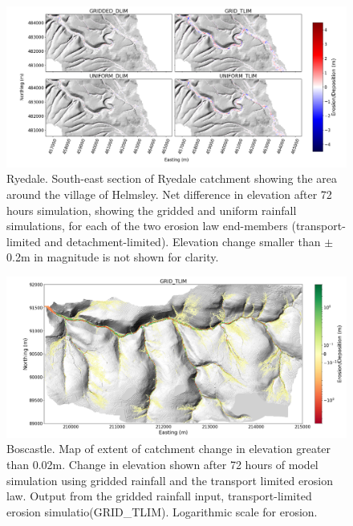 \begin{figure}
\includegraphics[width=25cm]{chp06_figures_scripts/figure_ryedale_erosion_diff_ensemble.png}
\caption{Ryedale. South-east section of Ryedale catchment showing the area around the village of Helmsley. Net difference in elevation after 72 hours simulation, showing the gridded and uniform rainfall simulations, for each of the two erosion law end-members (transport-limited and detachment-limited). Elevation change smaller than \(\pm\) 0.2m in magnitude is not shown for clarity. }
\label{fig_ryedale_2dplan_erosion_ensemble}
\end{figure}

\begin{figure}
\includegraphics[width=25cm]{chp06_figures_scripts/boscastle_erodediff_grid_tlim.png}
\caption{Boscastle. Map of extent of catchment change in elevation greater than 0.02m. Change in elevation shown after 72 hours of model simulation using gridded rainfall and the transport limited erosion law. Output from the gridded rainfall input, transport-limited erosion simulatio(GRID\_TLIM). Logarithmic scale for erosion.}
\label{fig_boscastle_erodediff_grid_tlim}
\end{figure}

